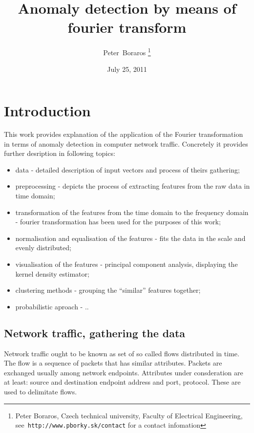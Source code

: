 \documentclass[a4paper]{IEEEtran}
\begin{document}
\title{Anomaly detection by means of fourier transform}
\date{July 25, 2011}
\author{Peter~Boraros %
\thanks{{Peter Boraros}, Czech technical university, Faculty of Electrical Engineering,
see~\texttt{http://www.pborky.sk/contact} for a contact infomation}}%



\maketitle
\IEEEdisplaynotcompsoctitleabstractindextext
\IEEEpeerreviewmaketitle

\section{Introduction}
This work provides explanation of the application of the Fourier transformation in terms of anomaly detection in computer network traffic.
Concretely it provides further desription in following topics:
\begin{itemize}
	\item data - detailed description of input vectors and process of theirs gathering;
	\item preprocessing - depicts the process of extracting features from the raw data in time domain;
	\item transformation of the features from the time domain to the frequency domain - fourier transformation has been used for the purposes of this work;
	\item normalisation and equalisation of the features - fits the data in the scale and evenly distributed;
	\item visualisation of the features - principal component analysis, displaying the kernel density estimator;
	\item clustering methods - grouping the ``similar'' features together;
	\item probabilistic aproach - ..
\end{itemize}

\subsection{Network traffic, gathering the data}
Network traffic ought to be known as set of so called flows distributed in time.
The flow is a sequence of packets that has similar attributes. Packets
are exchanged usually among network endpoints. Attributes
under consderation are at least: source and destination endpoint address and port,
protocol. These are used to delimitate flows.
\end{document}
